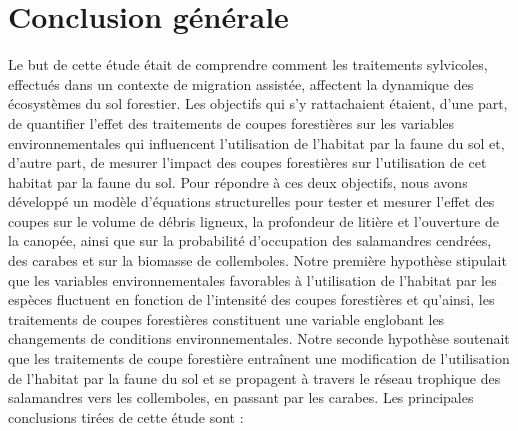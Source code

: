 \chapter*{Conclusion générale}           %
\label{chap-conclusion}         %

Le but de cette étude était de comprendre comment les traitements sylvicoles, effectués dans un contexte de migration assistée, affectent la dynamique des écosystèmes du sol forestier.
Les objectifs qui s’y rattachaient étaient, d'une part, de quantifier l'effet des traitements de coupes forestières sur les variables environnementales qui influencent 
l'utilisation de l'habitat par la faune du sol et, d'autre part, de mesurer l'impact des coupes forestières sur l'utilisation de cet habitat par la faune du sol.
Pour répondre à ces deux objectifs, nous avons développé un modèle d'équations structurelles pour tester et mesurer l'effet des coupes sur le volume de débris ligneux, 
la profondeur de litière et l'ouverture de la canopée, ainsi que sur la probabilité d'occupation des salamandres cendrées, des carabes et sur la biomasse de collemboles.
Notre première hypothèse stipulait que les variables environnementales favorables à l'utilisation de l'habitat par les espèces fluctuent 
en fonction de l'intensité des coupes forestières et qu'ainsi, les traitements de coupes forestières constituent une variable englobant les changements de conditions environnementales. 
Notre seconde hypothèse soutenait que les traitements de coupe forestière entraînent une modification de l'utilisation de l'habitat par la faune du sol et se propagent à travers 
le réseau trophique des salamandres vers les collemboles, en passant par les carabes. 
Les principales conclusions tirées de cette étude sont :

